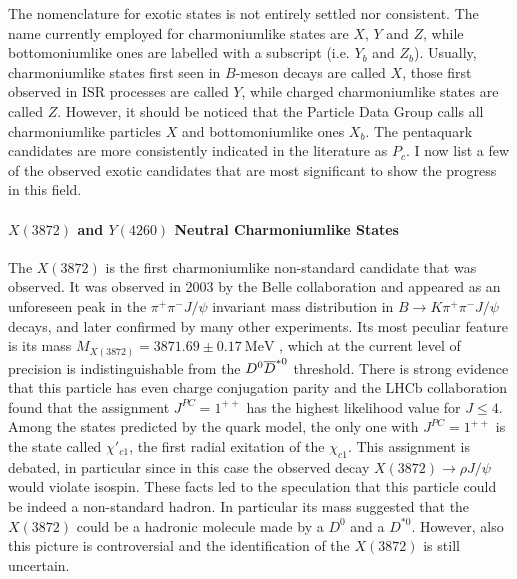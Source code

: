 The nomenclature for exotic states is not entirely settled nor consistent. The name currently employed for charmoniumlike states are $X$, $Y$ and $Z$, while bottomoniumlike ones are labelled with a subscript (i.e. $Y_b$ and $Z_b$). Usually, charmoniumlike states first seen in $B$-meson decays are called $X$, those first observed in ISR processes are called $Y$, while charged charmoniumlike states are called $Z$. However, it should be noticed that the Particle Data Group calls all charmoniumlike particles $X$ and bottomoniumlike ones $X_b$. The pentaquark candidates are more consistently indicated in the literature as $P_c$. I now list a few of the observed exotic candidates that are most significant to show the progress in this field.

\paragraph{$X(3872)$ and $Y(4260)$ Neutral Charmoniumlike States} The $X(3872)$ is the first charmoniumlike non-standard candidate that was observed. It was observed in 2003 by the Belle collaboration and appeared as an unforeseen peak in the $\pi^+ \pi^- J/\psi$ invariant mass distribution in $B \to K \pi^+ \pi^- J/\psi$ decays, and later confirmed by many other experiments. Its most peculiar feature is its mass $M_{X(3872)} = 3871.69 \pm 0.17 \ \text{MeV}$ \cite{Patrignani:2016xqp}, which at the current level of precision is indistinguishable from the $D^0 \overline{D}^{* 0}$ threshold. There is strong evidence that this particle has even charge conjugation parity and the LHCb collaboration found that the assignment $J^{P C} = 1^{+ +}$ has the highest likelihood value for $J \leq 4$. Among the states predicted by the quark model, the only one with $J^{P C} = 1^{+ +}$ is the state called $\chi'_{c1}$, the first radial exitation of the $\chi_{c1}$. This assignment is debated, in particular since in this case the observed decay $X(3872) \to \rho J/\psi$ would violate isospin. These facts led to the speculation that this particle could be indeed a non-standard hadron. In particular its mass suggested that the $X(3872)$ could be a hadronic molecule made by a $D^0$ and a $D^{* 0}$. However, also this picture is controversial and the identification of the $X(3872)$ is still uncertain. 

